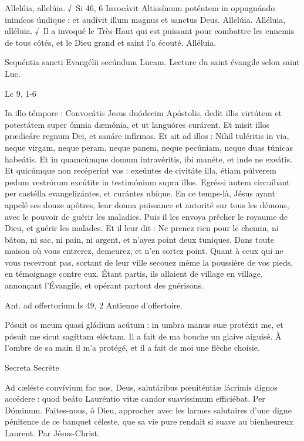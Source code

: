\begin{paracol}{2}
Allelúia, allelúia. √~Si 46, 6 Invocávit Altissímum poténtem in oppugnándo inimícos úndique : et audívit illum magnus et sanctus Deus. Allelúia.
\switchcolumn
Alléluia, alléluia. √~Il a invoqué le Très-Haut qui est puissant pour combattre les ennemis de tous côtés, et le Dieu grand et saint l’a écouté. Alléluia.
\switchcolumn*

Sequéntia sancti Evangélii secúndum Lucam.
\switchcolumn
Lecture du saint évangile selon saint Luc.
\switchcolumn*

Lc 9, 1-6
\switchcolumn

\switchcolumn*

In illo témpore : Convocátis Jesus  duódecim Apóstolis, dedit illis virtútem et potestátem super ómnia dæmónia, et ut languóres curárent. Et misit illos prædicáre regnum Dei, et sanáre infírmos. Et ait ad illos : Nihil tuléritis in via, neque virgam, neque peram, neque panem, neque pecúniam, neque duas túnicas habeátis. Et in quamcúmque domum intravéritis, ibi manéte, et inde ne exeátis. Et quicúmque non recéperint vos : exeúntes de civitáte illa, étiam púlverem pedum vestrórum excútite in testimónium supra illos. Egréssi autem circuíbant per castélla evangelizántes, et curántes ubíque.
\switchcolumn
En ce temps-là, Jésus ayant appelé ses  douze apôtres, leur donna puissance et autorité sur tous les démons, avec le pouvoir de guérir les maladies. Puis il les envoya prêcher le royaume de Dieu, et guérir les  malades. Et il leur dit : Ne prenez rien pour le chemin, ni bâton, ni sac, ni pain, ni argent, et n’ayez point deux tuniques. Dans toute maison où vous entrerez, demeurez, et n’en sortez point. Quant à ceux qui ne vous recevront pas, sortant de leur ville secouez même la poussière de vos pieds, en témoignage contre eux. Étant partis, ils allaient de village en village, annonçant l’Évangile, et opérant partout des guérisons.
\switchcolumn*

Ant. ad offertorium.\hfill Is 49, 2
\switchcolumn
Antienne d’offertoire.
\switchcolumn*

Pósuit os meum quasi gládium acútum : in umbra manus suæ protéxit me, et pósuit me sicut sagíttam eléctam.
\switchcolumn
Il a fait de ma bouche un glaive aiguisé. À l’ombre de sa main il m’a protégé, et il a fait de moi une flèche choisie.
\switchcolumn*

Secreta
\switchcolumn
Secrète
\switchcolumn*

Ad cæléste convívium fac nos, Deus,  salutáribus pœniténtiæ lácrimis dignos accédere : quod beáto Lauréntio vitæ candor suavíssimum efficiébat. Per Dóminum.
\switchcolumn
Faites-nous, ô Dieu, approcher avec les  larmes salutaires d’une digne pénitence de ce banquet céleste, que sa vie pure rendait si suave au bienheureux Laurent. Par Jésus-Christ.
\switchcolumn*


\end{paracol}
